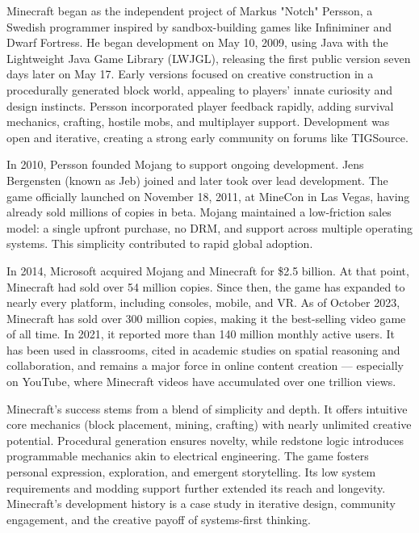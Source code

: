 \begin{historical}
Minecraft began as the independent project of Markus "Notch" Persson, a Swedish programmer inspired by sandbox-building games like Infiniminer and Dwarf Fortress. He began development on May 10, 2009, using Java with the Lightweight Java Game Library (LWJGL), releasing the first public version seven days later on May 17. Early versions focused on creative construction in a procedurally generated block world, appealing to players' innate curiosity and design instincts. Persson incorporated player feedback rapidly, adding survival mechanics, crafting, hostile mobs, and multiplayer support. Development was open and iterative, creating a strong early community on forums like TIGSource.

In 2010, Persson founded Mojang to support ongoing development. Jens Bergensten (known as Jeb) joined and later took over lead development. The game officially launched on November 18, 2011, at MineCon in Las Vegas, having already sold millions of copies in beta. Mojang maintained a low-friction sales model: a single upfront purchase, no DRM, and support across multiple operating systems. This simplicity contributed to rapid global adoption.

In 2014, Microsoft acquired Mojang and Minecraft for \$2.5 billion. At that point, Minecraft had sold over 54 million copies. Since then, the game has expanded to nearly every platform, including consoles, mobile, and VR. As of October 2023, Minecraft has sold over 300 million copies, making it the best-selling video game of all time. In 2021, it reported more than 140 million monthly active users. It has been used in classrooms, cited in academic studies on spatial reasoning and collaboration, and remains a major force in online content creation — especially on YouTube, where Minecraft videos have accumulated over one trillion views.

Minecraft’s success stems from a blend of simplicity and depth. It offers intuitive core mechanics (block placement, mining, crafting) with nearly unlimited creative potential. Procedural generation ensures novelty, while redstone logic introduces programmable mechanics akin to electrical engineering. The game fosters personal expression, exploration, and emergent storytelling. Its low system requirements and modding support further extended its reach and longevity. Minecraft’s development history is a case study in iterative design, community engagement, and the creative payoff of systems-first thinking.
\end{historical}